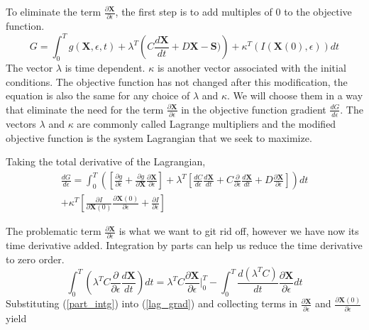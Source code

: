 \documentclass{tufte-handout}
\begin{document}
 To eliminate the term $ \frac{\partial \mathbf{X}}{\partial \epsilon}$, the first step is to  add  multiples of $0$ to the objective function.
 \begin{equation}
G =  \int^T_0 g(\mathbf{X},\epsilon,t)   + \lambda^T \left( C \frac{d \mathbf{X}}{dt} + D \mathbf{X} - \mathbf{S}) \right) + \kappa^T\left( I(\mathbf{X}(0),\epsilon) \right) dt
 \end{equation}
 The vector  $\lambda$  is time dependent. $\kappa$  is another vector associated with the initial conditions.   The objective function has not changed after this modification, the equation is also the same  for any choice of $\lambda$ and $\kappa$. We will choose them in a way that eliminate the need for  the term   $ \frac{\partial \mathbf{X}}{\partial \epsilon}$ in the objective function gradient $\frac{dG}{d\epsilon}$. The vectors $\lambda$ and $\kappa$ are commonly called Lagrange multipliers and the modified objective function is the system Lagrangian that we seek to maximize. 
 
 Taking the total derivative of the Lagrangian,
 \begin{multline}\label{lag_grad}
\frac{d G}{d\epsilon} = \int_{0}^{T}\left( \left[  \frac{\partial g}{\partial \epsilon} +  \frac{\partial g}{\partial \mathbf{X}} \frac{\partial \mathbf{X}}{\partial \epsilon}\right] +  \lambda^T\left[ \frac{d C}{d \epsilon} \frac{d \mathbf{X}}{dt} + C \frac{\partial}{\partial \epsilon} \frac{d \mathbf{X}}{dt} + D \frac{\partial \mathbf{X}}{\partial \epsilon} \right]  \right) dt \\ +  \kappa^T  \left[ \frac{\partial I}{\partial \mathbf{X}(0)}  \frac{\partial \mathbf{X}(0)}{\partial \epsilon} + \frac{\partial I}{\partial \epsilon} \right] 
 \end{multline}

The problematic term  $\frac{\partial \mathbf{X}}{\partial \epsilon}$  is what we want to git rid off, however we have now its time derivative added. Integration by parts can help us reduce the time derivative to zero order.  
\begin{equation}\label{part_intg}
 \int_{0}^{T} \left(  \lambda^T C \frac{\partial}{\partial \epsilon}   \frac{d \mathbf{X}}{dt} \right) dt = \lambda^T C \frac{\partial \mathbf{X}}{\partial \epsilon}|^T_0 - \int_{0}^{T}
   \frac{ d\left(  \lambda^T C \right) }{dt} \frac{\partial \mathbf{X}}{\partial \epsilon} dt
\end{equation}
Substituting (\ref*{part_intg}) into (\ref*{lag_grad}) and collecting terms  in $\frac{\partial \mathbf{X}}{\partial \epsilon}$ and  $\frac{\partial \mathbf{X}(0)}{\partial \epsilon}$ yield
\end{document}
